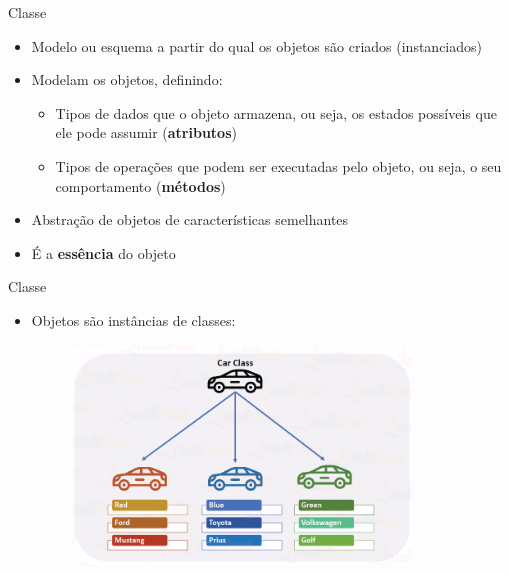 \documentclass{beamer}
\begin{document}
\begin{frame}{Classe}
    \begin{itemize}
        \item Modelo ou esquema a partir do qual os objetos são criados (instanciados)
        \item Modelam os objetos, definindo:
        \begin{itemize}
            \item Tipos de dados que o objeto armazena, ou seja, os estados possíveis que ele pode assumir (\textbf{atributos})
            \item Tipos de operações que podem ser executadas pelo objeto, ou seja, o seu comportamento (\textbf{métodos})
        \end{itemize}
        \item Abstração de objetos de características semelhantes
        \item É a \textbf{essência} do objeto
    \end{itemize}
\end{frame}

\begin{frame}{Classe}
    \begin{itemize}
        \item Objetos são instâncias de classes:
        \begin{figure}[H]
            \includegraphics[width=9cm]{Theme/Logos/exemplo_classe_instancia.png}
        \end{figure}
    \end{itemize}
\end{frame}
\end{document}
